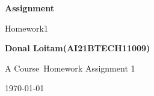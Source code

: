 \documentclass[10pt, a4paper]{article}
\newcommand\course{Course}                      %
\newcommand\hwnumber{1}                         %
\begin{document}
\begin{titlepage}
    \begin{center}
        \vspace*{3cm}
            
        \Huge
        \textbf{Assignment}
            
        \vspace{1cm}
        \huge
        Homework\hwnumber
            
        \vspace{1.5cm}
        \Large
            
        \textbf{Donal Loitam(AI21BTECH11009)}                     
        
            
        \vfill
        
        A \course \ Homework Assignment 1
            
        \vspace{1cm}
            
       
       
        
        \Large
        
        \today
            
    \end{center}
\end{titlepage}


\newpage
\begin{Problem}

\end{Problem}
    
\end{document}

